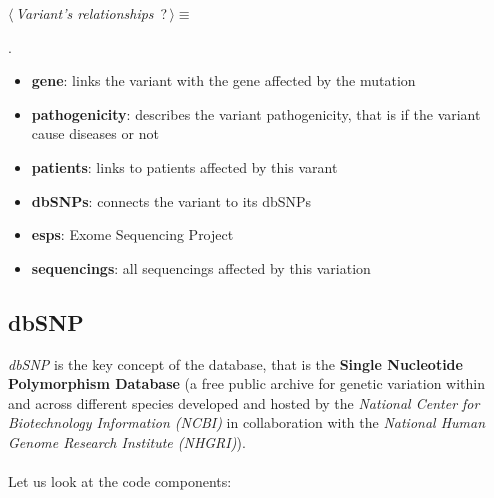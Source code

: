 	\begin{flushleft} \small
\begin{minipage}{\linewidth}\label{scrap3}\raggedright\small
{} $\langle\,${\itshape {Variant's relationships}}\nobreak\ {\footnotesize {?}}$\,\rangle\equiv$
\vspace{-1ex}
\begin{list}{}{} \item

                
        {\NWsep}
\end{list}
\vspace{-1.5ex}
\footnotesize
\begin{list}{}{\setlength{\itemsep}{-\parsep}\setlength{\itemindent}{-\leftmargin}}
\item {\NWtxtMacroNoRef}.

\item{}
\end{list}
\end{minipage}\vspace{4ex}
\end{flushleft}
\begin{itemize}
	\item \textbf{gene}: links the variant with the gene affected by the mutation
	\item \textbf{pathogenicity}: describes the variant pathogenicity, that is if the variant cause diseases or not
  	\item \textbf{patients}: links to patients affected by this varant
  	\item \textbf{dbSNPs}: connects the variant to its dbSNPs
  	\item \textbf{esps}: Exome Sequencing Project
  	\item \textbf{sequencings}: all sequencings affected by this variation
\end{itemize}


\subsection{dbSNP}
\emph{dbSNP} is the key concept of the database, that is the \textbf{Single Nucleotide Polymorphism Database} (a free public archive for genetic variation within and across different species developed and hosted by the \emph{National Center for Biotechnology Information (NCBI)} in collaboration with the \emph{National Human Genome Research Institute (NHGRI)}).
\\
\\Let us look at the code components:

